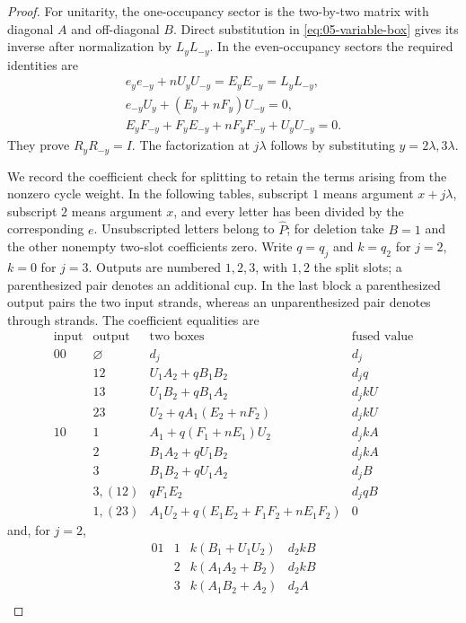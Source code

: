 \begin{proof}
For unitarity, the one-occupancy sector is the two-by-two matrix with diagonal \(A\) and off-diagonal \(B\). Direct substitution in \eqref{eq:05-variable-box} gives its inverse after normalization by \(L_yL_{-y}\). In the even-occupancy sectors the required identities are
\[
 \begin{gathered}
 e_ye_{-y}+nU_yU_{-y}=E_yE_{-y}=L_yL_{-y},\\
 e_{-y}U_y+(E_y+nF_y)U_{-y}=0,\\
 E_yF_{-y}+F_yE_{-y}+nF_yF_{-y}+U_yU_{-y}=0.
 \end{gathered}
\]
They prove \(R_yR_{-y}=I\). The factorization at \(j\lambda\) follows by substituting \(y=2\lambda,3\lambda\).

We record the coefficient check for splitting to retain the terms arising from the nonzero cycle weight. In the following tables, subscript \(1\) means argument \(x+j\lambda\), subscript \(2\) means argument \(x\), and every letter has been divided by the corresponding \(e\). Unsubscripted letters belong to \(\widehat P\); for deletion take \(B=1\) and the other nonempty two-slot coefficients zero. Write \(q=q_j\) and \(k=q_2\) for \(j=2\), \(k=0\) for \(j=3\). Outputs are numbered \(1,2,3\), with \(1,2\) the split slots; a parenthesized pair denotes an additional cup. In the last block a parenthesized output pairs the two input strands, whereas an unparenthesized pair denotes through strands. The coefficient equalities are
\[
\begin{array}{c|c|c|c}
\text{input}&\text{output}&\text{two boxes}&\text{fused value}\\\hline
00&\varnothing&d_j&d_j\\
&12&U_1A_2+qB_1B_2&d_jq\\
&13&U_1B_2+qB_1A_2&d_jkU\\
&23&U_2+qA_1(E_2+nF_2)&d_jkU\\\hline
10&1&A_1+q(F_1+nE_1)U_2&d_jkA\\
&2&B_1A_2+qU_1B_2&d_jkA\\
&3&B_1B_2+qU_1A_2&d_jB\\
&3,(12)&qF_1E_2&d_jqB\\
&1,(23)&A_1U_2+q(E_1E_2+F_1F_2+nE_1F_2)&0
\end{array}
\]
and, for \(j=2\),
\[
\begin{array}{c|c|c|c}
01&1&k(B_1+U_1U_2)&d_2kB\\
&2&k(A_1A_2+B_2)&d_2kB\\
&3&k(A_1B_2+A_2)&d_2A\\

\end{array}\]
\end{proof}
